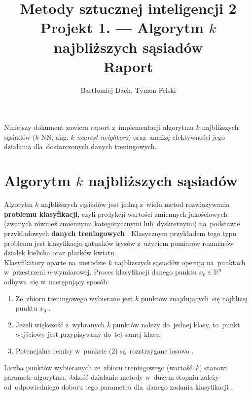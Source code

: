 \documentclass[11pt,a4paper]{article}
\begin{document}
\title{Metody sztucznej inteligencji 2 \\
\Large{
    Projekt 1. --- Algorytm $k$ najbliższych sąsiadów \\
    Raport
}}
\author{Bartłomiej Dach, Tymon Felski}
\maketitle

Niniejszy dokument zawiera raport z~implementacji algorytmu $k$ najbliższych sąsiadów ($k$-NN, ang. \emph{$k$ nearest neighbors}) oraz~analizę efektywności jego działania dla~dostarczonych danych treningowych.

\section{Algorytm $k$ najbliższych sąsiadów}

Algorytm $k$ najbliższych sąsiadów jest jedną z~wielu metod rozwiązywania \textbf{problemu klasyfikacji}, czyli predykcji wartości zmiennych jakościowych (zwanych również zmiennymi kategorycznymi lub~dyskretnymi) na~podstawie przykładowych \textbf{danych treningowych} \cite[s.~9--10]{hastie2009}.
Klasycznym przykładem tego typu problemu jest klasyfikacja gatunków irysów z~użyciem pomiarów rozmiarów działek kielicha oraz płatków kwiatu. \\

Klasyfikatory oparte na~metodzie $k$ najbliższych sąsiadów operują na~punktach w~przestrzeni $n$-wymiarowej.
Proces klasyfikacji danego punktu $x_0 \in \mathbb{R}^n$ odbywa~się w~następujący sposób:

\begin{enumerate}
    \item Ze~zbioru treningowego wybierane jest $k$ punktów znajdujących~się najbliżej punktu $x_0$ \cite[s.~261]{vapnik1998}.
    \item Jeżeli większość z~wybranych $k$ punktów należy do~jednej klasy, to~punkt wejściowy jest przypisywany do~tej samej klasy.
    \item Potencjalne remisy w~punkcie (2) są~rozstrzygane losowo \cite[s.~463--464]{hastie2009}.
\end{enumerate}

Liczba punktów wybieranych ze~zbioru treningowego (wartość~$k$) stanowi parametr algorytmu.
Jakość działania metody w~dużym stopniu zależy od~odpowiedniego doboru tego parametru dla~danego zadania klasyfikacji \cite[s.~468--470]{hastie2009}. \\
\end{document}
